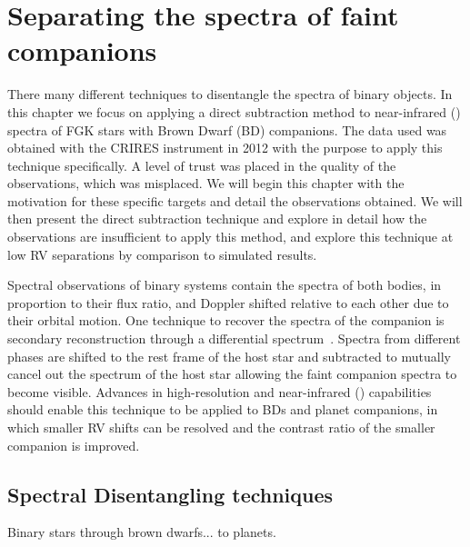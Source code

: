 
\chapter{Separating the spectra of faint companions} %
\label{cha:direct_recovery}

There many different techniques to disentangle the spectra of binary objects.
In this chapter we focus on applying a direct subtraction method to near-infrared (\nir{}) spectra of {FGK} stars with Brown Dwarf (BD) companions.
The data used was obtained with the {CRIRES} instrument in 2012 with the purpose to apply this technique specifically.
A level of trust was placed in the quality of the observations, which was misplaced.
We will begin this chapter with the motivation for these specific targets and detail the observations obtained.
We will then present the direct subtraction technique and explore in detail how the observations are insufficient to apply this method, and explore this technique at low RV separations by comparison to simulated results.


Spectral observations of binary systems contain the spectra of both bodies, in proportion to their flux ratio, and Doppler shifted relative to each other due to their orbital motion.
One technique to recover the spectra of the companion is secondary reconstruction through a differential spectrum~\citep{ferluga_separating_1997}.
Spectra from different phases are shifted to the rest frame of the host star and subtracted to mutually cancel out the spectrum of the host star allowing the faint companion spectra to become visible.
Advances in high-resolution and near-infrared (\nir{}) capabilities should enable this technique to be applied to BDs and planet companions, in which smaller {RV} shifts can be resolved and the contrast ratio of the smaller companion is improved.

\section{Spectral Disentangling techniques}

Binary stars through brown dwarfs...
to planets.


